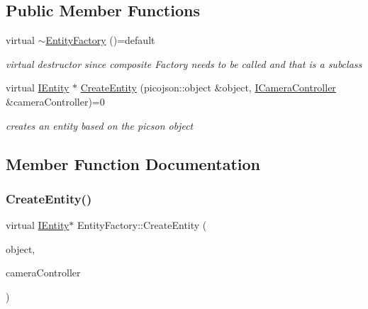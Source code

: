 \subsection*{Public Member Functions}
\begin{DoxyCompactItemize}
\item 
\mbox{\label{classEntityFactory_ae3246f06fa101178803f76582323d4ad}} 
virtual \hyperlink{classEntityFactory_ae3246f06fa101178803f76582323d4ad}{$\sim$\+Entity\+Factory} ()=default
\begin{DoxyCompactList}\small\item\em virtual destructor since composite Factory needs to be called and that is a subclass \end{DoxyCompactList}\item 
virtual \hyperlink{classIEntity}{I\+Entity} $\ast$ \hyperlink{classEntityFactory_a7f579ca02f15935e6901e5c955c9726a}{Create\+Entity} (picojson\+::object \&object, \hyperlink{classICameraController}{I\+Camera\+Controller} \&camera\+Controller)=0
\begin{DoxyCompactList}\small\item\em creates an entity based on the picson object \end{DoxyCompactList}\end{DoxyCompactItemize}


\subsection{Member Function Documentation}
\mbox{\label{classEntityFactory_a7f579ca02f15935e6901e5c955c9726a}} 
\subsubsection{\texorpdfstring{Create\+Entity()}{CreateEntity()}}
{\footnotesize\ttfamily virtual \hyperlink{classIEntity}{I\+Entity}$\ast$ Entity\+Factory\+::\+Create\+Entity (\begin{DoxyParamCaption}\item[{picojson\+::object \&}]{object,  }\item[{\hyperlink{classICameraController}{I\+Camera\+Controller} \&}]{camera\+Controller }\end{DoxyParamCaption})\hspace{0.3cm}{\ttfamily [pure virtual]}}



